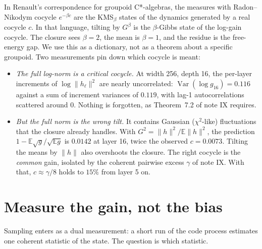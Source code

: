 \documentclass[11pt]{article}
\theoremstyle{definition}
\theoremstyle{remark}
\newcommand{\E}{\mathbb E}
\newcommand{\Var}{\operatorname{Var}}
\begin{document}
\noindent In Renault's correspondence for groupoid C*-algebras, the measures with Radon--Nikodym cocycle $e^{-\beta c}$ are the KMS$_\beta$ states of the dynamics generated by a real cocycle $c$. In that language, tilting by $G^\beta$ is the $\beta$-Gibbs state of the log-gain cocycle. The closure sees $\beta=2$, the mean is $\beta=1$, and the residue is the free-energy gap. We use this as a dictionary, not as a theorem about a specific groupoid. Two measurements pin down which cocycle is meant:
\begin{itemize}
\item \emph{The full log-norm is a critical cocycle.} At width 256, depth 16, the per-layer increments of $\log\|h_\ell\|^2$ are nearly uncorrelated: $\Var(\log g_{16})=0.116$ against a sum of increment variances of $0.119$, with lag-1 autocorrelations scattered around $0$. Nothing is forgotten, as Theorem~7.2 of note IX requires.
\item \emph{But the full norm is the wrong tilt.} It contains Gaussian ($\chi^2$-like) fluctuations that the closure already handles. With $G^2=\|h\|^2/\E\|h\|^2$, the prediction $1-\E\sqrt g/\sqrt{\E g}$ is $0.0142$ at layer 16, twice the observed $c=0.0073$. Tilting the means by $\|h\|$ also overshoots the closure. The right cocycle is the \emph{common} gain, isolated by the coherent pairwise excess $\gamma$ of note IX. With that, $c\approx\gamma/8$ holds to $15\%$ from layer 5 on.
\end{itemize}

\section{Measure the gain, not the bias}\label{sec:measure}

Sampling enters as a dual measurement: a short run of the code process estimates one coherent statistic of the state. The question is which statistic.
\end{document}
